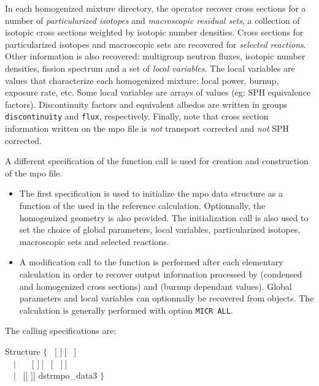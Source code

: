 In each homogenized mixture directory, the  operator recover
cross sections for a number of {\sl particularized isotopes} and {\sl macroscopic
residual sets}, a collection of isotopic cross sections weighted by isotopic number densities.
Cross sections for particularized isotopes and macroscopic sets are recovered for
{\sl selected reactions}. Other information is also recovered: multigroup neutron
fluxes, isotopic number densities, fission spectrum and a set
of {\sl local variables}. The local variables are values that characterize each
homogenized mixture: local power, burnup, exposure rate, etc. Some local variables
are arrays of values (eg: SPH equivalence factors). Discontinuity factors and equivalent albedos
are written in groups {\tt discontinuity} and {\tt flux}, respectively. Finally, note that cross section
information written on the {\sc mpo} file is {\sl not} transport corrected and {\sl not}
SPH corrected.

\vskip 0.1cm

A different specification of the  function call is used for
creation and construction of the {\sc mpo} file.
\begin{itemize}
\item The first specification is used to initialize the {\sc mpo} data structure
as a function of the  used in the reference calculation. Optionnally,
the homogenized geometry is also provided. The initialization call is also used to
set the choice of global parameters, local variables, particularized isotopes,
macroscopic sets and selected reactions.
\item A modification call to the  function is performed after each
elementary calculation in order to recover output information processed by 
(condensed and homogenized cross sections) and  (burnup dependant values).
Global parameters and local variables can optionnally be recovered from 
objects. The  calculation is generally performed with option {\tt MICR ALL}.
\end{itemize}

The calling specifications are:

\vskip -0.5cm

\begin{DataStructure}{Structure }
$\{$~ \moc{:=}  $[$  $]~[$~ $]$ \moc{::}  \\
~~$|$~ \moc{:=}  ~~$[$  $]~[$ ~$[$~ $]~]$ \moc{::}  \\
~~$|$~ \moc{:=}   $[[$  $]]$ \moc{::} dstr{mpo\_data3} $\}$ \\
\end{DataStructure}

